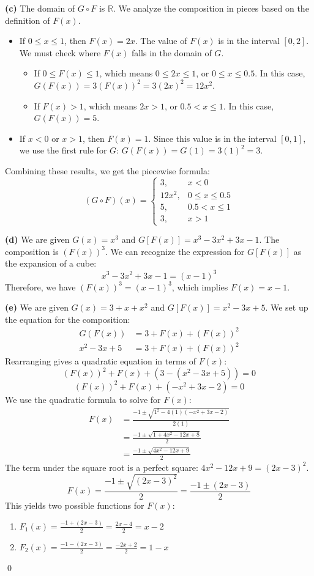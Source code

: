 \textbf{(c)}
The domain of \(G \circ F\) is \(\mathbb{R}\). We analyze the composition in pieces based on the definition of \(F(x)\).
\begin{itemize}
\item If $0 \le x \le 1$, then $F(x) = 2x$. The value of $F(x)$ is in the interval $[0, 2]$. We must check where $F(x)$ falls in the domain of $G$.
\begin{itemize}
\item If $0 \le F(x) \le 1$, which means $0 \le 2x \le 1$, or $0 \le x \le 0.5$. In this case, $G(F(x)) = 3(F(x))^2 = 3(2x)^2 = 12x^2$.
\item If $F(x) > 1$, which means $2x > 1$, or $0.5 < x \le 1$. In this case, $G(F(x)) = 5$.
\end{itemize}
\item If $x < 0$ or $x > 1$, then $F(x)=1$. Since this value is in the interval $[0,1]$, we use the first rule for $G$: $G(F(x)) = G(1) = 3(1)^2 = 3$.
\end{itemize}
Combining these results, we get the piecewise formula:
\[ (G \circ F)(x) = \begin{cases} 
3, & x < 0 \\
12x^2, & 0 \le x \le 0.5 \\
5, & 0.5 < x \le 1 \\
3, & x > 1
\end{cases}
\]

\textbf{(d)}
We are given $G(x) = x^3$ and $G[F(x)] = x^3 - 3x^2 + 3x - 1$.
The composition is $(F(x))^3$. We can recognize the expression for $G[F(x)]$ as the expansion of a cube:
\[ x^3 - 3x^2 + 3x - 1 = (x-1)^3 \]
Therefore, we have $(F(x))^3 = (x-1)^3$, which implies $F(x) = x-1$.

\textbf{(e)}
We are given $G(x) = 3 + x + x^2$ and $G[F(x)] = x^2 - 3x + 5$.
We set up the equation for the composition:
\begin{align*}
G(F(x)) &= 3 + F(x) + (F(x))^2 \\
x^2 - 3x + 5 &= 3 + F(x) + (F(x))^2
\end{align*}
Rearranging gives a quadratic equation in terms of $F(x)$:
\[ (F(x))^2 + F(x) + (3 - (x^2 - 3x + 5)) = 0 \]
\[ (F(x))^2 + F(x) + (-x^2 + 3x - 2) = 0 \]
We use the quadratic formula to solve for $F(x)$:
\begin{align*}
F(x) &= \frac{-1 \pm \sqrt{1^2 - 4(1)(-x^2+3x-2)}}{2(1)} \\
&= \frac{-1 \pm \sqrt{1 + 4x^2 - 12x + 8}}{2} \\
&= \frac{-1 \pm \sqrt{4x^2 - 12x + 9}}{2}
\end{align*}
The term under the square root is a perfect square: $4x^2 - 12x + 9 = (2x-3)^2$.
\[ F(x) = \frac{-1 \pm \sqrt{(2x-3)^2}}{2} = \frac{-1 \pm (2x-3)}{2} \]
This yields two possible functions for $F(x)$:
\begin{enumerate}
\item $F_1(x) = \frac{-1 + (2x-3)}{2} = \frac{2x-4}{2} = x-2$
\item $F_2(x) = \frac{-1 - (2x-3)}{2} = \frac{-2x+2}{2} = 1-x$
\end{enumerate}\qed



